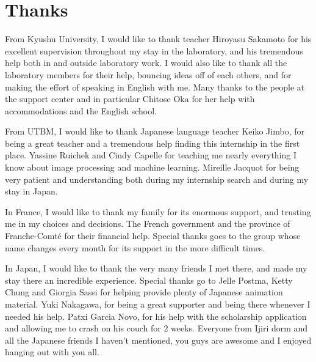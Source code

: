 \section*{Thanks}
From Kyushu University, I would like to thank teacher Hiroyasu Sakamoto for his excellent supervision throughout my stay in the laboratory, and his tremendous help both in and outside laboratory work. I would also like to thank all the laboratory members for their help, bouncing ideas off of each others, and for making the effort of speaking in English with me. Many thanks to the people at the support center and in particular Chitose Oka for her help with accommodations and the English school.

From UTBM, I would like to thank Japanese language teacher Keiko Jimbo, for being a great teacher and a tremendous help finding this internship in the first place. Yassine Ruichek and Cindy Capelle for teaching me nearly everything I know about image processing and machine learning. Mireille Jacquot for being very patient and understanding both during my internship search and during my stay in Japan.

In France, I would like to thank my family for its enormous support, and trusting me in my choices and decisions. The French government and the province of Franche-Comté for their financial help. Special thanks goes to the group whose name changes every month for its support in the more difficult times.

In Japan, I would like to thank the very many friends I met there, and made my stay there an incredible experience. Special thanks go to Jelle Postma, Ketty Chung and Giorgia Sassi for helping provide plenty of Japanese animation material. Yuki Nakagawa, for being a great supporter and being there whenever I needed his help. Patxi Garcia Novo, for his help with the scholarship application and allowing me to crash on his couch for $2$ weeks. Everyone from Ijiri dorm and all the Japanese friends I haven't mentioned, you guys are awesome and I enjoyed hanging out with you all.
